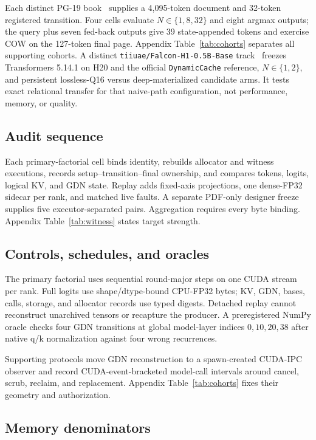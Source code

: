 \documentclass{article}
\begin{document}
Each distinct PG-19 book~\citep{rae2020compressive} supplies a 4,095-token
document and 32-token registered transition.  Four cells evaluate
$N\in\{1,8,32\}$ and eight argmax outputs; the query plus seven fed-back outputs
give 39 state-appended tokens and exercise COW on the 127-token final page.
Appendix Table~\ref{tab:cohorts} separates all supporting cohorts.  A distinct
\texttt{tiiuae/Falcon-H1-0.5B-Base} track~\citep{zuo2025falconh1} freezes
Transformers 5.14.1 on H20 and the official
\texttt{DynamicCache} reference, $N\in\{1,2\}$, and persistent lossless-Q16
versus deep-materialized candidate arms.  It tests exact relational transfer
for that naive-path configuration, not performance, memory, or quality.

\subsection{Audit sequence}

Each primary-factorial cell binds identity, rebuilds allocator and witness
executions, records setup--transition--final ownership, and compares tokens,
logits, logical KV, and GDN state.  Replay adds fixed-axis projections, one
dense-FP32 sidecar per rank, and matched live faults.  A separate PDF-only
designer freeze supplies five executor-separated pairs.  Aggregation requires
every byte binding.  Appendix Table~\ref{tab:witness} states target strength.

\subsection{Controls, schedules, and oracles}

The primary factorial uses sequential round-major steps on one CUDA stream per
rank.  Full logits use shape/dtype-bound CPU-FP32 bytes; KV, GDN, bases, calls,
storage, and allocator records use typed digests.  Detached replay cannot
reconstruct unarchived tensors or recapture the producer.  A preregistered
NumPy oracle checks four GDN transitions at global model-layer indices
$0,10,20,38$ after native q/k normalization against four wrong recurrences.

Supporting protocols move GDN reconstruction to a spawn-created CUDA-IPC
observer and record CUDA-event-bracketed model-call intervals around cancel,
scrub, reclaim, and replacement.  Appendix Table~\ref{tab:cohorts} fixes their
geometry and authorization.

\subsection{Memory denominators}
\label{sec:denominators}
\end{document}
